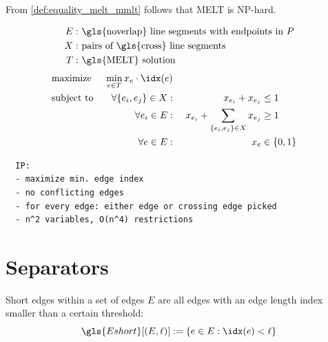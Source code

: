 
\begin{theorem}
  From \cref{def:equality_melt_mmlt} follows that \gls{MELT} is
  NP-hard.
\end{theorem}


\begin{problem}
  \hfill
  \begin{alignat*}{1}
    E: &~ \text{\gls{noverlap} line segments with endpoints in \(P\)} \\
    X: &~ \text{pairs of \gls{cross} line segments} \\
    T: &~ \text{\gls{MELT} solution}
  \end{alignat*}
  \begin{alignat*}{3}
    &\text{maximize } & \min\limits_{e \in T} x_e \cdot \idx(e) \\
    &\text{subject to } & \forall \{e_i,e_j\} \in X : &~& x_{e_i} + x_{e_j} &\leq 1 \\
    && \forall e_i \in E : &~
      & x_{e_i} + \sum\limits_{\{e_i, e_j\} \in X} x_{e_j} &\geq 1 \\
    && \forall e \in E : &~& x_e &\in \{0,1\}
  \end{alignat*}
\end{problem}

\begin{verbatim}
  IP:
  - maximize min. edge index
  - no conflicting edges
  - for every edge: either edge or crossing edge picked
  - n^2 variables, O(n^4) restrictions
\end{verbatim}

\section{Separators}


\begin{definition}
  \label{def:short_edges}
  Short edges within a set of edges \(E\) are all edges with an
  edge length index smaller than a certain threshold:
  \[
    \gls{Eshort}[(E, \ell)] := \{ e \in E : \idx(e) < \ell \}
  \]
\end{definition}

